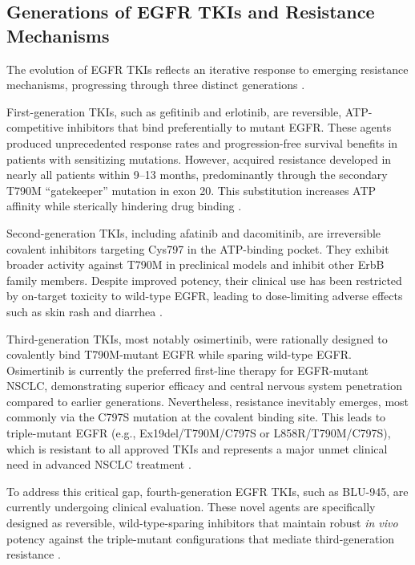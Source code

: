 \subsection{Generations of EGFR TKIs and Resistance Mechanisms}

The evolution of EGFR TKIs reflects an iterative response to emerging resistance mechanisms, progressing through three distinct generations \parencite{RotowJanne2023}.

First-generation TKIs, such as gefitinib and erlotinib, are reversible, ATP-competitive inhibitors that bind preferentially to mutant EGFR. These agents produced unprecedented response rates and progression-free survival benefits in patients with sensitizing mutations. However, acquired resistance developed in nearly all patients within 9--13 months, predominantly through the secondary T790M ``gatekeeper'' mutation in exon 20. This substitution increases ATP affinity while sterically hindering drug binding \parencite{Passaroetal2021}.

Second-generation TKIs, including afatinib and dacomitinib, are irreversible covalent inhibitors targeting Cys797 in the ATP-binding pocket. They exhibit broader activity against T790M in preclinical models and inhibit other ErbB family members. Despite improved potency, their clinical use has been restricted by on-target toxicity to wild-type EGFR, leading to dose-limiting adverse effects such as skin rash and diarrhea \parencite{Passaroetal2021, RotowJanne2023}.

Third-generation TKIs, most notably osimertinib, were rationally designed to covalently bind T790M-mutant EGFR while sparing wild-type EGFR. Osimertinib is currently the preferred first-line therapy for EGFR-mutant NSCLC, demonstrating superior efficacy and central nervous system penetration compared to earlier generations. Nevertheless, resistance inevitably emerges, most commonly via the C797S mutation at the covalent binding site. This leads to triple-mutant EGFR (e.g., Ex19del/T790M/C797S or L858R/T790M/C797S), which is resistant to all approved TKIs and represents a major unmet clinical need in advanced NSCLC treatment \parencite{RotowJanne2023, Maliketal2025}. 

To address this critical gap, fourth-generation EGFR TKIs, such as BLU-945, are currently undergoing clinical evaluation. These novel agents are specifically designed as reversible, wild-type-sparing inhibitors that maintain robust \textit{in vivo} potency against the triple-mutant configurations that mediate third-generation resistance \parencite{Limetal2024}.

